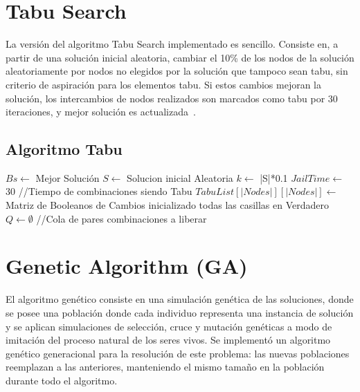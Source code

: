 \documentclass{ci5652}
\begin{document}
\section{Tabu Search}
La versión del algoritmo Tabu Search implementado es sencillo. Consiste en, a partir de una solución inicial aleatoria, cambiar el 10\% de los nodos de la solución aleatoriamente por nodos no elegidos por la solución que tampoco sean tabu, sin criterio de aspiración para los elementos tabu. Si estos cambios mejoran la solución, los intercambios de nodos realizados son marcados como tabu por 30 iteraciones, y mejor solución es actualizada~\cite{fgtabu}.

\subsection{Algoritmo Tabu}
\begin{algorithm}[h!]
\DontPrintSemicolon
$Bs\leftarrow$ Mejor Solución\;
$S \leftarrow$ Solucion inicial Aleatoria\;
$k \leftarrow$ |S|*0.1\;
$JailTime \leftarrow$ 30 //Tiempo de combinaciones siendo Tabu\;
$TabuList[|Nodes|][|Nodes|] \leftarrow$ Matriz de Booleanos de Cambios inicializado todas las casillas en Verdadero\;
$Q \leftarrow \emptyset$ //Cola de pares combinaciones a liberar\;
\end{algorithm}

\section{Genetic Algorithm (GA)}
El algoritmo genético consiste en una simulación genética de las soluciones, donde se posee una población donde cada individuo representa una instancia de solución y se aplican simulaciones de selección, cruce y mutación genéticas a modo de imitación del proceso natural de los seres vivos. Se implementó un algoritmo genético generacional para la resolución de este problema: las nuevas poblaciones reemplazan a las anteriores, manteniendo el mismo tamaño en la población durante todo el algoritmo.
\end{document}

